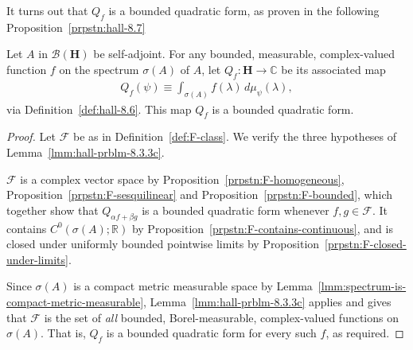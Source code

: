 It turns out that $Q_f$ is a bounded quadratic form, as proven in the following Proposition~\ref{prpstn:hall-8.7}

\begin{proposition}
    \label{prpstn:hall-8.7}
    \leanok
    Let $A$ in $\mathcal{B}(\mathbf{H})$ be self-adjoint. For any bounded, measurable, complex-valued function $f$ on the spectrum $\sigma(A)$ of $A$, let $Q_f : \mathbf{H} \rightarrow \mathbb{C}$ be its associated map
    \begin{align}
        Q_f(\psi) \equiv \int_{\sigma(A)} f(\lambda) \, d\mu_\psi(\lambda),
    \end{align}
    via Definition~\ref{def:hall-8.6}. This map $Q_f$ is a bounded quadratic form.
\end{proposition}
\begin{proof}
    \leanok
Let $\mathcal{F}$ be as in Definition~\ref{def:F-class}. We verify the three hypotheses of Lemma~\ref{lmm:hall-prblm-8.3.3c}.

$\mathcal{F}$ is a complex vector space by Proposition~\ref{prpstn:F-homogeneous}, Proposition~\ref{prpstn:F-sesquilinear} and Proposition~\ref{prpstn:F-bounded}, which together show that $Q_{\alpha f + \beta g}$ is a bounded quadratic form whenever $f,g \in \mathcal{F}$. It contains $C^0(\sigma(A);\mathbb{R})$ by Proposition~\ref{prpstn:F-contains-continuous}, and is closed under uniformly bounded pointwise limits by Proposition~\ref{prpstn:F-closed-under-limits}.

Since $\sigma(A)$ is a compact metric measurable space by Lemma~\ref{lmm:spectrum-is-compact-metric-measurable}, Lemma~\ref{lmm:hall-prblm-8.3.3c} applies and gives that $\mathcal{F}$ is the set of \textit{all} bounded, Borel-measurable, complex-valued functions on $\sigma(A)$. That is, $Q_f$ is a bounded quadratic form for every such $f$, as required.
\end{proof}

